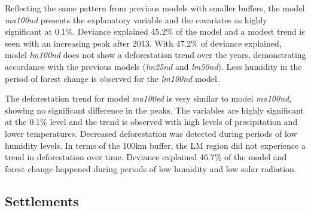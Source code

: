 Reflecting the same pattern from previous models with smaller buffers, the model \textit{ma100nd} presents the explanatory variable and the covariates as highly significant at 0.1\%. Deviance explained 45.2\% of the model and a modest trend is seen with an increasing peak after 2013. With 47.2\% of deviance explained, model \textit{lm100nd} does not show a deforestation trend over the years, demonstrating accordance with the previous models (\textit{lm25nd} and \textit{lm50nd}). Less humidity in the period of forest change is observed for the \textit{lm100nd} model. 

The deforestation trend for model \textit{ma100ed} is very similar to model \textit{ma100nd}, showing no significant difference in the peaks. The variables are highly significant at the 0.1\% level and the trend is observed with high levels of precipitation and lower temperatures. Decreased deforestation was detected during periods of low humidity levels. In terms of the 100km buffer, the LM region did not experience a trend in deforestation over time. Deviance explained 46.7\% of the model and forest change happened during periods of low humidity and low solar radiation.

\subsection{Settlements}

